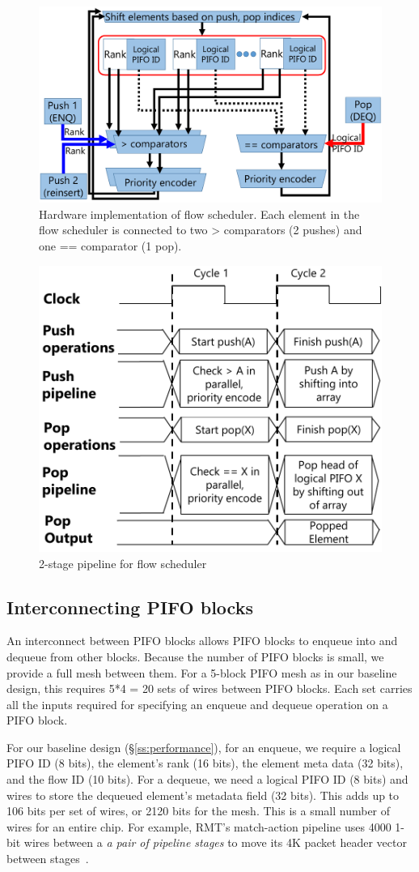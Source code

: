 \begin{figure}[!t]
  \centering
  \includegraphics[width=0.6\columnwidth]{pifo_flow_scheduler_hardware.pdf}
  \caption{Hardware implementation of flow scheduler. Each element in the flow
  scheduler is connected to two > comparators (2 pushes) and one == comparator (1
  pop).}
  \label{fig:flow_scheduler}
\end{figure}

\begin{figure}[!t]
  \centering
  \includegraphics[width=0.6\columnwidth]{pifo_2stage_pipeline.pdf}
  \caption{2-stage pipeline for flow scheduler}
  \label{fig:2stage}
\end{figure}

\subsection{Interconnecting PIFO blocks}
\label{ss:interconnect}

An interconnect between PIFO blocks allows PIFO blocks to enqueue into and
dequeue from other blocks. Because the number of PIFO blocks is small, we
provide a full mesh between them. For a 5-block PIFO mesh as in our baseline
design, this requires 5*4 = 20 sets of wires between PIFO blocks. Each set
carries all the inputs required for specifying an enqueue and dequeue operation
on a PIFO block.

For our baseline design (\S\ref{ss:performance}), for an enqueue, we require a
logical PIFO ID (8 bits), the element's rank (16 bits), the element meta data
(32 bits), and the flow ID (10 bits). For a dequeue, we need a logical PIFO ID
(8 bits) and wires to store the dequeued element's metadata field (32 bits).
This adds up to 106 bits per set of wires, or 2120 bits for the mesh. This is a
small number of wires for an entire chip.  For example, RMT's match-action pipeline
uses 4000 1-bit wires between a {\em a pair of pipeline stages} to move its 4K
packet header vector between stages~\cite{rmt}. 

